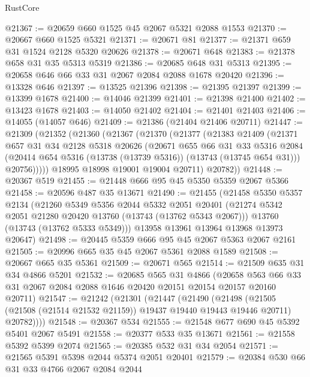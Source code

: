 \begin{lexlean}{RustCore}
\begin{coremodule}
@21367 := @20659 @660 @1525 @45 @2067 @5321 @2088 @1553
@21370 := @20667 @660 @1525 @5321
@21371 := @20671 @81
@21377 := @21371 @659 @31 @1524 @2128 @5320 @20626
@21378 := @20671 @648
@21383 := @21378 @658 @31 @35 @5313 @5319
@21386 := @20685 @648 @31 @5313
@21395 := @20658 @646 @66 @33 @31 @2067 @2084 @2088 @1678 @20420
@21396 := @13328 @646
@21397 := @13525 @21396
@21398 := @21395 @21397
@21399 := @13399 @1678
@21400 := @14046 @21399
@21401 := @21398 @21400
@21402 := @13423 @1678
@21403 := @14050 @21402
@21404 := @21401 @21403
@21406 := @14055 (@14057 @646)
@21409 := @21386 (@21404 @21406 @20711)
@21447 := @21309
    (@21352
      (@21360
        (@21367
          (@21370
            (@21377
              (@21383
                @21409
                (@21371
                  @657
                  @31
                  @34
                  @2128
                  @5318
                  @20626
                  (@20671
                    @655
                    @66
                    @31
                    @33
                    @5316
                    @2084
                    (@20414 @654 @5316 (@13738 (@13739 @5316)) (@13743 (@13745 @654 @31)))
                    @20756)))))
          @18995
          @18998
          @19001
          @19004
          @20711)
        @20782))
@21448 := @20367 @519
@21455 := @21448 @666 @95 @45 @5350 @5359 @2067 @5366
@21458 := @20596 @487 @35 @13671
@21490 := @21455
    (@21458
      @5350
      @5357
      @2134
      (@21260
        @5349
        @5356
        @2044
        @5332
        @2051
        @20401
        (@21274 @5342 @2051 @21280 @20420 @13760 (@13743 (@13762 @5343 @2067)))
        @13760
        (@13743 (@13762 @5333 @5349)))
      @13958
      @13961
      @13964
      @13968
      @13973
      @20647)
@21498 := @20445 @5359 @666 @95 @45 @2067 @5363 @2067 @2161
@21505 := @20996 @665 @35 @45 @2067 @5361 @2088 @1589
@21508 := @20667 @665 @35 @5361
@21509 := @20671 @565
@21514 := @21509 @635 @31 @34 @4866 @5201
@21532 := @20685
    @565
    @31
    @4866
    (@20658 @563 @66 @33 @31 @2067 @2084 @2088 @1646 @20420 @20151 @20154 @20157 @20160 @20711)
@21547 := @21242
    (@21301
      (@21447
        (@21490
          (@21498
            (@21505 (@21508 (@21514 @21532 @21159)) @19437 @19440 @19443 @19446 @20711)
            @20782))))
@21548 := @20367 @534
@21555 := @21548 @677 @690 @45 @5392 @5401 @2067 @5491
@21558 := @20377 @533 @35 @13671
@21561 := @21558 @5392 @5399 @2074
@21565 := @20385 @532 @31 @34 @2054
@21571 := @21565 @5391 @5398 @2044 @5374 @2051 @20401
@21579 := @20384 @530 @66 @31 @33 @4766 @2067 @2084 @2044

\end{coremodule}
\end{lexlean}
